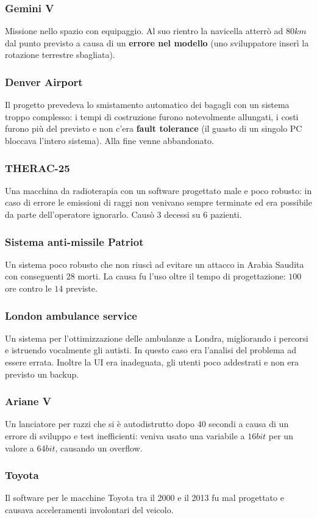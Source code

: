 \subsubsection{Gemini V}
Missione nello spazio con equipaggio. Al suo rientro la navicella atterrò ad $80km$ dal punto previsto a causa di un \textbf{errore nel modello} (uno sviluppatore inserì la rotazione terrestre sbagliata).
\subsubsection{Denver Airport}
Il progetto prevedeva lo smistamento automatico dei bagagli con un sistema troppo complesso: i tempi di costruzione furono notevolmente allungati, i costi furono più del previsto e non c'era \textbf{fault tolerance} (il guasto di un singolo PC bloccava l'intero sistema). Alla fine venne abbandonato.
\subsubsection{THERAC-25}
Una macchina da radioterapia con un software progettato male e poco robusto: in caso di errore le emissioni di raggi non venivano sempre terminate ed era possibile da parte dell'operatore ignorarlo. Causò $3$ decessi su $6$ pazienti.
\subsubsection{Sistema anti-missile Patriot}
Un sistema poco robusto che non riuscì ad evitare un attacco in Arabia Saudita con conseguenti 28 morti. La causa fu l'uso oltre il tempo di progettazione: $100$ ore contro le $14$ previste.
\subsubsection{London ambulance service}
Un sistema per l'ottimizzazione delle ambulanze a Londra, migliorando i percorsi e istruendo vocalmente gli autisti. In questo caso era l'analisi del problema ad essere errata. Inoltre la UI era inadeguata, gli utenti poco addestrati e non era previsto un backup.
\subsubsection{Ariane V}
Un lanciatore per razzi che si è autodistrutto dopo $40$ secondi a causa di un errore di sviluppo e test inefficienti: veniva usato una variabile a $16bit$ per un valore a $64bit$, causando un overflow.
\subsubsection{Toyota}
Il software per le macchine Toyota tra il 2000 e il 2013 fu mal progettato e causava acceleramenti involontari del veicolo.
